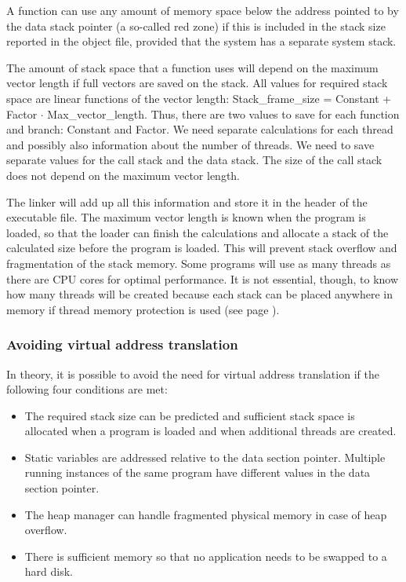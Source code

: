 \documentclass[forwardcom.tex]{subfiles}
\begin{document}
A function can use any amount of memory space below the address pointed to by the data stack pointer (a so-called red zone) if this is included in the stack size reported in the object file, provided that the system has a separate system stack. 
\vv

The amount of stack space that a function uses will depend on the maximum vector length if full vectors are saved on the stack. All values for required stack space are linear functions of the vector length: Stack\_frame\_size = Constant + Factor $\cdot$ Max\_vector\_length. Thus, there are two values to save for each function and branch: Constant and Factor. We need separate calculations for each thread and possibly also information about the number of threads. We need to save separate values for the call stack and the data stack. The size of the call stack does not depend on the maximum vector length. 
\vv

The linker will add up all this information and store it in the header of the executable file. The maximum vector length is known when the program is loaded, so that the loader can finish the calculations and allocate a stack of the calculated size before the program is loaded. This will prevent stack overflow and fragmentation of the stack memory. Some programs will use as many threads as there are CPU cores for optimal performance. It is not essential, though, to know how many threads will be created because each stack can be placed anywhere in memory if thread memory protection is used (see page \pageref{threadMemoryProtection}). 
\vv

\subsubsection{Avoiding virtual address translation} \label{AvoidingVirtualAddressTranslation}
In theory, it is possible to avoid the need for virtual address translation if the following four conditions are met: 

\begin{itemize}
\item The required stack size can be predicted and sufficient stack space is allocated when a 
program is loaded and when additional threads are created. 

\item Static variables are addressed relative to the data section pointer. Multiple running instances of the same program have different values in the data section pointer. 

\item The heap manager can handle fragmented physical memory in case of heap overflow. 

\item There is sufficient memory so that no application needs to be swapped to a hard disk.
\end{itemize}
\end{document}
